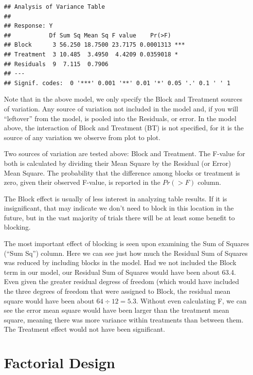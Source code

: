 \documentclass[
]{book}
\begin{document}
\begin{verbatim}
## Analysis of Variance Table
## 
## Response: Y
##           Df Sum Sq Mean Sq F value    Pr(>F)    
## Block      3 56.250 18.7500 23.7175 0.0001313 ***
## Treatment  3 10.485  3.4950  4.4209 0.0359018 *  
## Residuals  9  7.115  0.7906                      
## ---
## Signif. codes:  0 '***' 0.001 '**' 0.01 '*' 0.05 '.' 0.1 ' ' 1
\end{verbatim}

Note that in the above model, we only specify the Block and Treatment sources of variation. Any source of variation not included in the model and, if you will ``leftover'' from the model, is pooled into the Residuals, or error. In the model above, the interaction of Block and Treatment (BT) is not specified, for it is the source of any variation we observe from plot to plot.

Two sources of variation are tested above: Block and Treatment. The F-value for both is calculated by dividing their Mean Square by the Residual (or Error) Mean Square. The probability that the difference among blocks or treatment is zero, given their observed F-value, is reported in the \(Pr(>F)\) column.

The Block effect is usually of less interest in analyzing table results. If it is insignificant, that may indicate we don't need to block in this location in the future, but in the vast majority of trials there will be at least some benefit to blocking.

The most important effect of blocking is seen upon examining the Sum of Squares (``Sum Sq'') column. Here we can see just how much the Residual Sum of Squares was reduced by including blocks in the model. Had we not included the Block term in our model, our Residual Sum of Squares would have been about 63.4. Even given the greater residual degress of freedom (which would have included the three degrees of freedom that were assigned to Block, the residual mean square would have been about \(64\div12 = 5.3\). Without even calculating F, we can see the error mean square would have been larger than the treatment mean square, meaning there was more variance within treatments than between them. The Treatment effect would not have been significant.

\hypertarget{factorial-design}{%
\section{Factorial Design}\label{factorial-design}}
\end{document}
